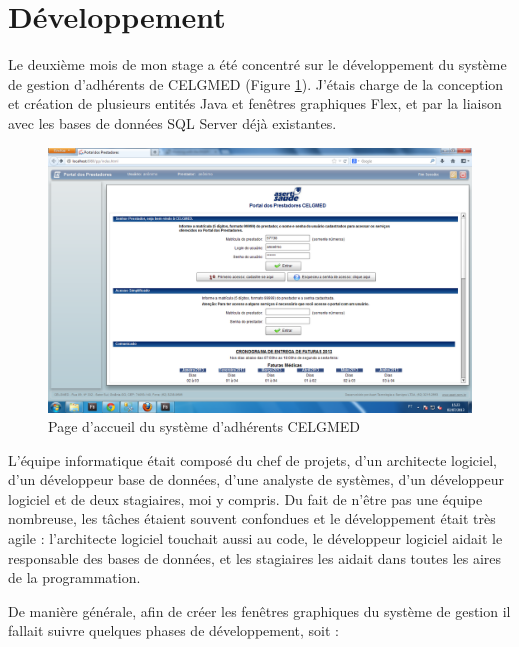 \section{Développement}


Le deuxième mois de mon stage a été concentré sur le développement du système de gestion d'adhérents de CELGMED (Figure \ref{pp}). J'étais charge de la conception et création de plusieurs entités Java et fenêtres graphiques Flex, et par la liaison avec les bases de données SQL Server déjà existantes.

\begin{figure}[h]
\begin{center}
    \includegraphics[scale=0.39]{img/pp}
    \caption{Page d'accueil du système d'adhérents CELGMED}
	\label{pp}
\end{center}
\end{figure}

L'équipe informatique était composé du chef de projets, d'un architecte logiciel, d'un développeur base de données, d'une analyste de systèmes, d'un développeur logiciel et de deux stagiaires, moi y compris. Du fait de n'être pas une équipe nombreuse, les tâches étaient souvent confondues et le développement était très agile : l'architecte logiciel touchait aussi au code, le développeur logiciel aidait le responsable des bases de données, et les stagiaires les aidait dans toutes les aires de la programmation.

De manière générale, afin de créer les fenêtres graphiques du système de gestion il fallait suivre quelques phases de développement, soit :


